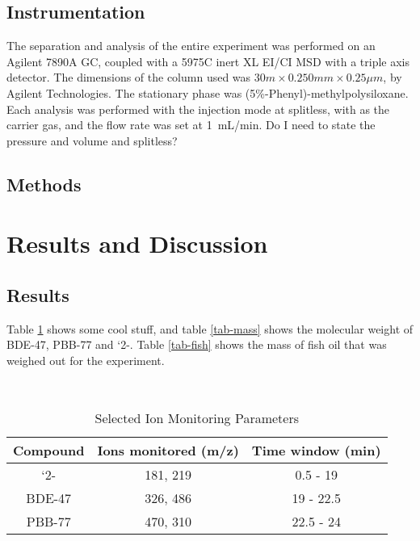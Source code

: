 \documentclass[a4paper, 12pt]{article}
\begin{document}
\subsection{Instrumentation}
The separation and analysis of the entire experiment was performed on an Agilent 7890A GC, coupled with a 5975C inert XL EI/CI MSD with a triple axis detector. The dimensions of the column used was $30m \times 0.250mm \times 0.25\mu{}m$, by Agilent Technologies. The stationary phase was (5\%-Phenyl)-methylpolysiloxane. Each analysis was performed with the injection mode at splitless, with  as the carrier gas, and the flow rate was set at \SI{1}{mL/min}. Do I need to state the pressure and volume and splitless?

\subsection{Methods}


\section{Results and Discussion}

\subsection{Results}
Table \ref{tab-para} shows some cool stuff, and table \ref{tab-mass} shows the molecular weight of BDE-47, PBB-77 and `2-. Table \ref{tab-fish} shows the mass of fish oil that was weighed out for the experiment.

\begin{table}[h!]
	\centering
	\caption{Selected Ion Monitoring Parameters}
	\hfill \\
	\begin{tabular}{|c|c|c|}
		\hline
		Compound & Ions monitored (m/z) & Time window (min) \\
		\hline
		`2-\ce{HCH} & 181, 219 & 0.5 - 19 \\
		\hline
		BDE-47 & 326, 486 & 19 - 22.5 \\
		\hline
		PBB-77 & 470, 310 & 22.5 - 24 \\
		\hline
	\end{tabular}
	\label{tab-para}
\end{table}
\end{document}
